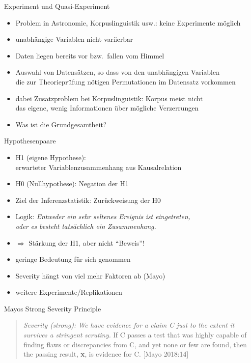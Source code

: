 \begin{frame}
  {Experiment und Quasi-Experiment}
  \begin{itemize}[<+->]
    \item Problem in Astronomie, Korpuslinguistik usw.: keine Experimente möglich
    \item \alert{unabhängige Variablen nicht variierbar}
    \item Daten liegen bereits vor bzw.\ fallen vom Himmel
    \item Auswahl von Datensätzen, so dass von den unabhängigen Variablen\\
      die zur Theorieprüfung nötigen Permutationen im Datensatz vorkommen
    \item dabei Zusatzproblem bei Korpuslinguistik: Korpus meist nicht\\
      das eigene, wenig Informationen über mögliche Verzerrungen
      \Zeile
    \item \alert{Was ist die Grundgesamtheit?}
  \end{itemize}
\end{frame}

\begin{frame}
  {Hypothesenpaare}
  \begin{itemize}[<+->]
    \item \alert{H1 (eigene Hypothese)}:\\
      erwarteter Variablenzusammenhang aus Kausalrelation
    \item \alert{H0 (Nullhypothese)}: Negation der H1
    \item Ziel der Inferenzstatistik: \alert{Zurückweisung der H0}
    \item Logik: \textit{Entweder ein sehr seltenes Ereignis ist eingetreten,\\
      oder es besteht tatsächlich ein Zusammenhang.}
    \item $\Rightarrow$ Stärkung der H1, aber \alert{nicht "`Beweis"'}!
      \vspace{\baselineskip}
    \item geringe Bedeutung für sich genommen
    \item \alert{Severity} hängt von viel mehr Faktoren ab (Mayo)
    \item weitere Experimente\slash Replikationen
  \end{itemize}
\end{frame}

\begin{frame}
  {Mayos Strong Severity Principle}
      \vspace{\baselineskip}
  \begin{quote}
    \textit{Severity (strong): We have evidence for a claim C just to the extent it survives a stringent scrutiny.} If C passes a test that was highly capable of finding flaws or discrepancies from C, and yet none or few are found, then the passing result, \textbf{x}, is evidence for C. [Mayo 2018:14]
  \end{quote}
\end{frame}

